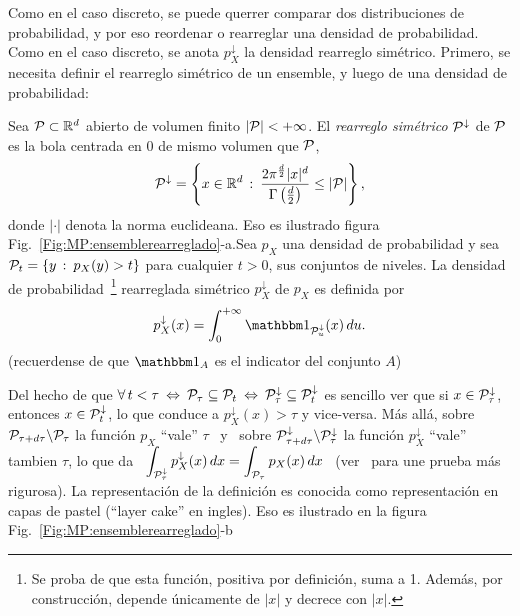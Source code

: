 Como  en el  caso  discreto, se  puede  querrer comparar  dos distribuciones  de
probabilidad, y  por eso  reordenar o rearreglar  una densidad  de probabilidad.
Como  en el  caso  discreto,  se anota  $p_X^\downarrow$  la densidad  rearreglo
sim\'etrico.  Primero,  se  necesita  definir  el rearreglo  sim\'etrico  de  un
ensemble, y luego de una densidad de probabilidad:
%
\begin{definicion}
\label{Def:MP:Rearreglo}
%
  Sea $\P \subset \Rset^d$ abierto de  volumen finito $|\P| < +\infty$.  El {\it
    rearreglo sim\'etrico} $\P^\downarrow$  de $\P$ es la bola  centrada en 0 de
  mismo volumen que $\P$, \ie
  \[
  \P^\downarrow  = \left\{  x  \in  \Rset^d \,  :  \: \frac{2  \pi^{\frac{d}{2}}
      |x|^d}{\Gamma\left(\frac{d}{2}\right)} \le |\P| \right\},
  \]
  donde  $|\cdot|$  denota  la   norma  euclideana.   Eso  es  ilustrado  figura
  Fig.~\ref{Fig:MP:ensemblerearreglado}-a.\newline  Sea  $p_X$  una densidad  de
  probabilidad y sea $\P_t = \{ y \, : \: p_X(y) > t \}$ para cualquier $t > 0$,
  sus conjuntos  de niveles.  La densidad de  probabilidad~\footnote{Se proba de
    que  esta funci\'on,  positiva por  definici\'on, suma  a 1.   Adem\'as, por
    construcci\'on,  depende  \'unicamente  de   $|x|$  y  decrece  con  $|x|$.}
  rearreglada sim\'etrico $p^\downarrow_X$ de $p_X$ es definida por
  \[
  p^\downarrow_X(x)  =  \int_0^{+\infty}  \un_{\P_u^\downarrow}(x) \,  du.
  \]
  (recuerdense de que $\un_A$ es el indicator  del conjunto $A$)
\end{definicion}
%
Del hecho  de que $\forall \, t  < \tau \: \Leftrightarrow  \: \P_\tau \subseteq
\P_t  \:  \Leftrightarrow \:  \P_\tau^\downarrow  \subseteq \P_t^\downarrow$  es
sencillo   ver   que   si   $x   \in  \P_\tau^\downarrow$,   entonces   $x   \in
\P_t^\downarrow$,  lo que  conduce a  $p_X^\downarrow(x) >  \tau$  y vice-versa.
M\'as  all\'a, sobre  $\P_{\tau+d\tau}  \backslash \P_\tau$  la funci\'on  $p_X$
``vale''   $\tau$   \   y   \   sobre   $\P_{\tau+d\tau}^\downarrow   \backslash
\P_\tau^\downarrow$  la funci\'on $p_X^\downarrow$  ``vale'' tambien  $\tau$, lo
que  da \  $\displaystyle  \int_{\P_\tau^\downarrow} p_X^\downarrow(x)  \, dx  =
\int_{\P_\tau} p_X(x)  \, dx$ \  (ver~\cite{LieLos01, WanMad04} para  une prueba
m\'as  rigurosa).   La representaci\'on  de  la  definici\'on  es conocida  como
representaci\'on  en  capas  de  pastel  (``layer cake''  en  ingles).   Eso  es
ilustrado en la figura Fig.~\ref{Fig:MP:ensemblerearreglado}-b
